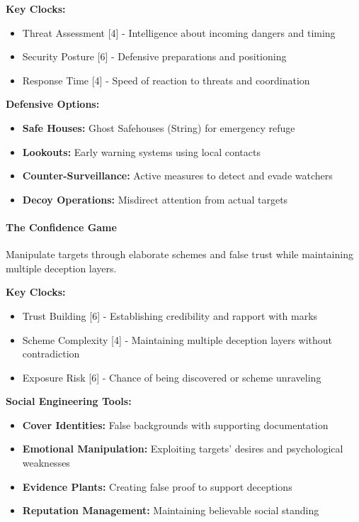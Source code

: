 \documentclass[11pt]{article}
\begin{document}
\textbf{Key Clocks:}
\begin{itemize}
    \item Threat Assessment [4] - Intelligence about incoming dangers and timing
    \item Security Posture [6] - Defensive preparations and positioning
    \item Response Time [4] - Speed of reaction to threats and coordination
\end{itemize}

\textbf{Defensive Options:}
\begin{itemize}
    \item \textbf{Safe Houses:} Ghost Safehouses (String) for emergency refuge
    \item \textbf{Lookouts:} Early warning systems using local contacts
    \item \textbf{Counter-Surveillance:} Active measures to detect and evade watchers
    \item \textbf{Decoy Operations:} Misdirect attention from actual targets
\end{itemize}

\paragraph{The Confidence Game}

Manipulate targets through elaborate schemes and false trust while maintaining multiple deception layers.

\textbf{Key Clocks:}
\begin{itemize}
    \item Trust Building [6] - Establishing credibility and rapport with marks
    \item Scheme Complexity [4] - Maintaining multiple deception layers without contradiction
    \item Exposure Risk [6] - Chance of being discovered or scheme unraveling
\end{itemize}

\textbf{Social Engineering Tools:}
\begin{itemize}
    \item \textbf{Cover Identities:} False backgrounds with supporting documentation
    \item \textbf{Emotional Manipulation:} Exploiting targets' desires and psychological weaknesses
    \item \textbf{Evidence Plants:} Creating false proof to support deceptions
    \item \textbf{Reputation Management:} Maintaining believable social standing
\end{itemize}
\end{document}
